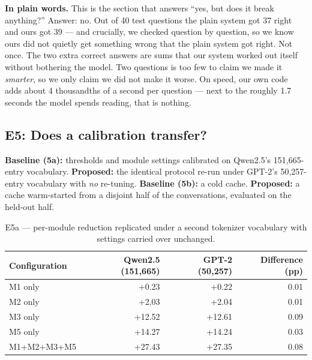 \documentclass[11pt,a4paper]{article}
\newcommand{\plain}[1]{%
  \par\vspace{1pt}
  \noindent\begin{tcolorbox}[colback=plainblue,colframe=plainrule,boxrule=0pt,
    leftrule=2.2pt,arc=0pt,left=7pt,right=5pt,top=4pt,bottom=4pt,breakable]
  \small\textbf{In plain words.} #1
  \end{tcolorbox}\par\vspace{2pt}}
\begin{document}
\plain{This is the section that answers ``yes, but does it break anything?''
Answer: no. Out of 40 test questions the plain system got 37 right and ours got
39 --- and crucially, we checked question by question, so we know ours did not
quietly get something wrong that the plain system got right. Not once. The two
extra correct answers are sums that our system worked out itself without
bothering the model. Two questions is too few to claim we made it \emph{smarter},
so we only claim we did not make it worse. On speed, our own code adds about 4
thousandths of a second per question --- next to the roughly 1.7 seconds the model
spends reading, that is nothing.}

\subsection{E5: Does a calibration transfer?}
\label{sec:e5}

\textbf{Baseline (5a):} thresholds and module settings calibrated on Qwen2.5's
151{,}665-entry vocabulary. \textbf{Proposed:} the identical protocol re-run
under GPT-2's 50{,}257-entry vocabulary with \emph{no} re-tuning.
\textbf{Baseline (5b):} a cold cache. \textbf{Proposed:} a cache warm-started
from a disjoint half of the conversations, evaluated on the held-out half.

\begin{table}[htbp]
\centering
\caption{E5a --- per-module reduction replicated under a second tokenizer
vocabulary with settings carried over unchanged.}
\label{tab:generalisation}
\footnotesize
\begin{tabular}{@{}l r r r@{}}
\toprule
\textbf{Configuration} & \textbf{Qwen2.5 (151{,}665)} & \textbf{GPT-2 (50{,}257)} &
\textbf{Difference (pp)} \\
\midrule
M1 only        & +0.23  & +0.22  & 0.01 \\
M2 only        & +2.03  & +2.04  & 0.01 \\
M3 only        & +12.52 & +12.61 & 0.09 \\
M5 only        & +14.27 & +14.24 & 0.03 \\
M1+M2+M3+M5    & +27.43 & +27.35 & 0.08 \\
\bottomrule
\end{tabular}
\end{table}
\end{document}
